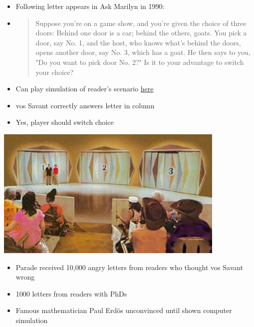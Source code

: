 \documentclass{beamer}
\theoremstyle{definition}
\begin{document}
\begin{frame}
\begin{itemize}
\item Following letter appears in \alert{Ask Marilyn} in 1990:
\item\begin{quotation}
Suppose you're on a game show, and you're given the choice of three
doors: Behind one door is a car; behind the others, goats. You pick
a door, say No. 1, and the host, who knows what's behind the doors,
opens another door, say No. 3, which has a goat. He then says to
you, "Do you want to pick door No. 2?" Is it to your advantage to
switch your choice?
\end{quotation}
\item Can play simulation of reader's scenario
\href{http://math.ucsd.edu/~crypto/Monty/monty.html}
{\color{blue}here}
\item vos Savant correctly answers letter in column
\item \alert{Yes}, player should switch choice
\end{itemize}
\end{frame}

\begin{frame}
\begin{center}\includegraphics[scale=.5]{Doors}\end{center}
\begin{itemize}
\item Parade received 10,000 angry letters from readers who thought
vos Savant wrong
\item 1000 letters from readers with PhDs
\item Famous mathematician
Paul Erd\"os unconvinced until shown computer simulation
\end{itemize}
\end{frame}
\end{document}
